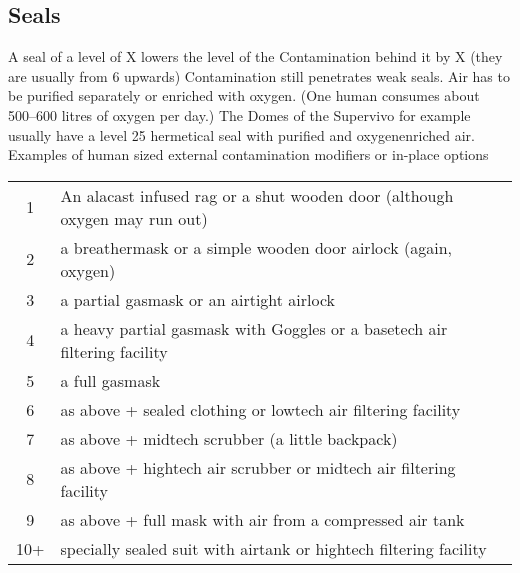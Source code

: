 \subsection{Seals}
A seal of a level of X lowers the level of the Contamination behind it by X (they are usually from 6 upwards)
Contamination still penetrates weak seals.
Air has to be purified separately or enriched with oxygen.
(One human consumes about 500--600 litres of oxygen per day.) The Domes of the Supervivo for
example usually have a level 25 hermetical seal with purified and oxygenenriched air.\vspace{1.5cm}
Examples of human sized external contamination modifiers or in-place options\vspace{1.5cm}
\begin{tabular}{cl}
    1& An alacast infused rag or a shut wooden door (although oxygen may run out)\\
    2& a breathermask or a simple wooden door airlock (again, oxygen)\\
    3& a partial gasmask  or an airtight airlock\\
    4& a heavy partial gasmask with Goggles or a basetech air filtering facility\\
    5& a full gasmask\\
    6& as above + sealed clothing or lowtech air filtering facility\\
    7& as above + midtech scrubber (a little backpack)\\
    8& as above + hightech air scrubber or midtech air filtering facility\\
    9& as above + full mask with air from a compressed air tank\\
    10+& specially sealed suit with airtank or hightech filtering facility\\
\end{tabular}\pagebreak
